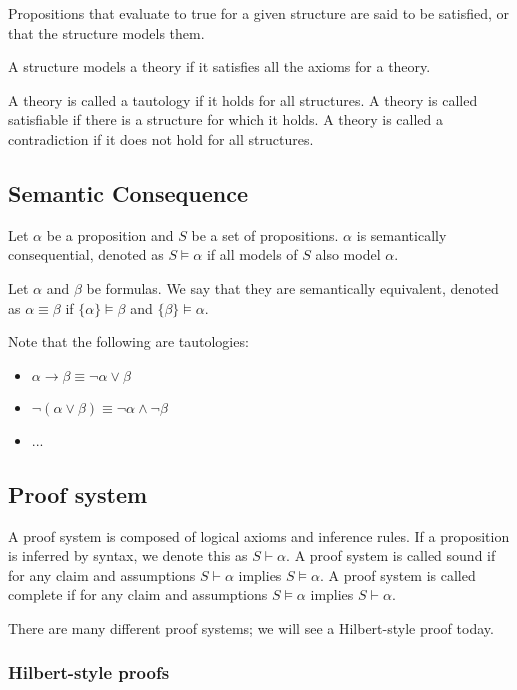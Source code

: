\documentclass{idc_msc}
\begin{document}
Propositions that evaluate to true for a given structure are said to be satisfied, or that the structure models them.

A structure models a theory if it satisfies all the axioms for a theory.

A theory is called a tautology if it holds for all structures.
A theory is called satisfiable if there is a structure for which it holds.
A theory is called a contradiction if it does not hold for all structures.


\subsection{Semantic Consequence}

Let \(\alpha\) be a proposition and \(S\) be a set of propositions.
\(\alpha\) is semantically consequential, denoted as \(S \models \alpha\) if all models of \(S\) also model \(\alpha\).

Let \(\alpha\) and \(\beta\) be formulas. We say that they are semantically equivalent, denoted as \(\alpha \equiv \beta\) if \(\{\alpha\} \models \beta\) and \(\{\beta\} \models \alpha\).

Note that the following are tautologies:

\begin{itemize}
  \item \(\alpha \to \beta \equiv \lnot \alpha \lor \beta\)
  \item \(\lnot(\alpha \lor \beta) \equiv \lnot \alpha \land \lnot \beta\)
  \item ...
\end{itemize}

\subsection{Proof system}

A proof system is composed of logical axioms and inference rules.
If a proposition is inferred by syntax, we denote this as \(S \vdash \alpha\).
A proof system is called sound if for any claim and assumptions \(S \vdash \alpha\) implies \(S \models \alpha\).
A proof system is called complete if for any claim and assumptions \(S \models \alpha\) implies \(S \vdash \alpha\).

There are many different proof systems; we will see a Hilbert-style proof today.

\subsubsection{Hilbert-style proofs}
\end{document}
